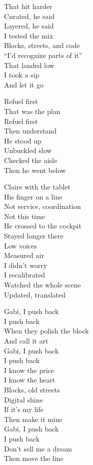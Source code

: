 \begin{lyrics}
That hit harder\\
Curated, he said\\
Layered, he said\\
I tested the mix\\
Blocks, streets, and code\\
“I’d recognize parts of it”\\
That landed low\\
I took a sip\\
And let it go

Refuel first\\
That was the plan\\
Refuel first\\
Then understand\\
He stood up\\
Unbuckled slow\\
Checked the aisle\\
Then he went below

Claire with the tablet\\
His finger on a line\\
Not service, coordination\\
Not this time\\
He crossed to the cockpit\\
Stayed longer there\\
Low voices\\
Measured air\\
I didn’t worry\\
I recalibrated\\
Watched the whole scene\\
Updated, translated

Gabi, I push back\\
I push back\\
When they polish the block\\
And call it art\\
Gabi, I push back\\
I push back\\
I know the price\\
I know the heart\\
Blocks, old streets\\
Digital shine\\
If it’s my life\\
Then make it mine\\
Gabi, I push back\\
I push back\\
Don’t sell me a dream\\
Then move the line


\end{lyrics}
